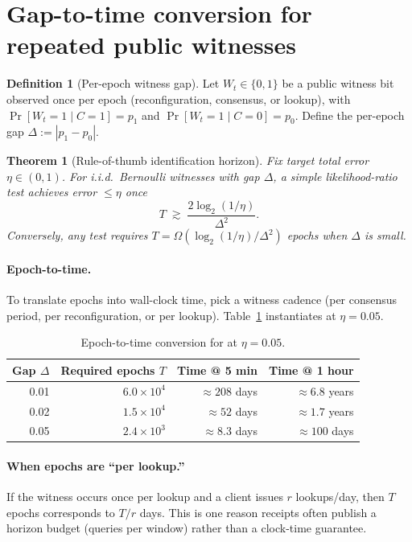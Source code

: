 \documentclass[11pt]{article}
\newtheorem{theorem}{Theorem}
\theoremstyle{definition}
\newtheorem{definition}{Definition}
\theoremstyle{remark}
\begin{document}
\section{Gap-to-time conversion for repeated public witnesses}

\begin{definition}[Per-epoch witness gap]
Let $W_t\in\{0,1\}$ be a public witness bit observed once per epoch (reconfiguration, consensus, or lookup),
with $\Pr[W_t=1\mid C=1]=p_1$ and $\Pr[W_t=1\mid C=0]=p_0$.
Define the per-epoch gap $\Delta := |p_1-p_0|$.
\end{definition}

\begin{theorem}[Rule-of-thumb identification horizon]\label{thm:repeat-witness}
Fix target total error $\eta\in(0,1)$.
For i.i.d.\ Bernoulli witnesses with gap $\Delta$, a simple likelihood-ratio test achieves error $\le \eta$ once
\[
T \;\gtrsim\; \frac{2\log_2(1/\eta)}{\Delta^2}.
\]
Conversely, any test requires $T=\Omega(\log_2(1/\eta)/\Delta^2)$ epochs when $\Delta$ is small.
\end{theorem}

\paragraph{Epoch-to-time.}
To translate epochs into wall-clock time, pick a witness cadence (per consensus period, per reconfiguration, or per lookup).
Table~\ref{tab:vignette-times} instantiates  at $\eta=0.05$.

\begin{table}[t]
\centering
\begin{tabular}{@{}r r r r@{}}
\toprule
Gap $\Delta$ & Required epochs $T$ & Time @ 5 min & Time @ 1 hour \\
\midrule
0.01 & $6.0\times 10^{4}$ & $\approx 208$ days & $\approx 6.8$ years \\
0.02 & $1.5\times 10^{4}$ & $\approx 52$ days & $\approx 1.7$ years \\
0.05 & $2.4\times 10^{3}$ & $\approx 8.3$ days & $\approx 100$ days \\
\bottomrule
\end{tabular}
\caption{Epoch-to-time conversion for  at $\eta=0.05$.}
\label{tab:vignette-times}
\end{table}

\paragraph{When epochs are ``per lookup.''}
If the witness occurs once per lookup and a client issues $r$ lookups/day, then $T$ epochs corresponds to $T/r$ days.
This is one reason receipts often publish a horizon budget (queries per window) rather than a clock-time guarantee.
\end{document}
